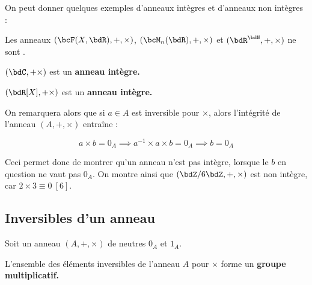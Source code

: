 \documentclass[a4paper,french,bookmarks]{article}
\begin{document}
On peut donner quelques exemples d'anneaux intègres et d'anneaux non intègres :

\begin{example}{}{}
    \begin{enumerate}
        \ithand Les anneaux $(\bcF(X, \bdR), +, \times)$, $(\bcM_n(\bdR), +, \times)$ et $(\bdR^\bdN, +, \times)$ ne sont \textit{}.
        
        \ithand $(\bdC, + \times)$ est un \bf{anneau intègre}.
        
        \ithand $(\bdR[X], + \times)$ est un \bf{anneau intègre}.
    \end{enumerate}
\end{example}

On remarquera alors que si $a \in A$ est inversible pour $\times$, alors l'intégrité de l'anneau $(A, +, \times)$ entraîne :

\[ a \times b = 0_A \implies a^{-1} \times a \times b = 0_A \implies b = 0_A\]

Ceci permet donc de montrer qu'un anneau n'est pas intègre, lorsque le $b$ en question ne vaut pas $0_A$. On montre ainsi que $(\bdZ/6\bdZ, +, \times)$ est non intègre, car $2 \times 3 \equiv 0 \ [6]$.

\subsection{Inversibles d'un anneau}

\begin{property}{}{}
    Soit un anneau $(A, +, \times)$ de neutres $0_A$ et $1_A$.
    
    L'ensemble des éléments inversibles de l'anneau $A$ pour $\times$ forme un \bf{groupe multiplicatif}.
\end{property}

\end{document}
